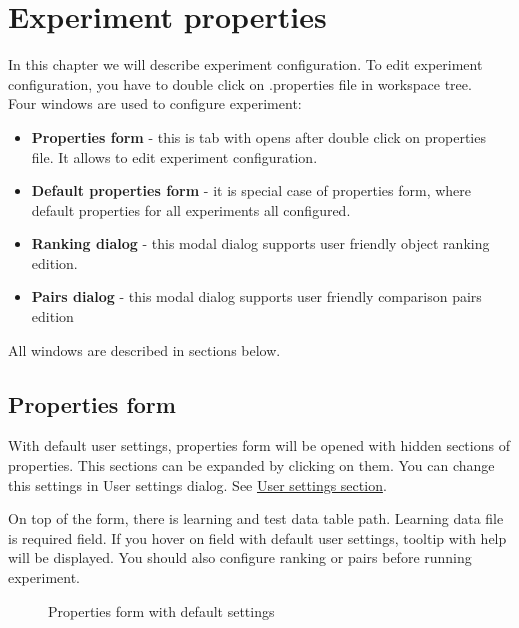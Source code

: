 \section{Experiment properties}\label{section:properties}

In this chapter we will describe experiment configuration. To edit experiment configuration, you have to double click on .properties file in workspace tree.\\

Four windows are used to configure experiment:
\begin{itemize}
	\item \textbf{Properties form} - this is tab with opens after double click on properties file. It allows to edit experiment configuration.
	\item \textbf{Default properties form} - it is special case of properties form, where default properties for all experiments all configured.
	\item \textbf{Ranking dialog} - this modal dialog supports user friendly object ranking edition.
	\item \textbf{Pairs dialog} - this modal dialog supports user friendly comparison pairs edition
\end{itemize}

All windows are described in sections below.

\subsection{Properties form}\label{sub:properties-form}

With default user settings, properties form will be opened with hidden sections of properties. This sections can be expanded by clicking on them. You can change this settings in User settings dialog. See \hyperref[section:user-settings]{User settings section}.

On top of the form, there is learning and test data table path. Learning data file is required field. If you hover on field with default user settings, tooltip with help will be displayed. You should also configure ranking or pairs before running experiment.

\begin{figure*}[!ht] 
	\centering
	\caption{Properties form with default settings}
\end{figure*}

